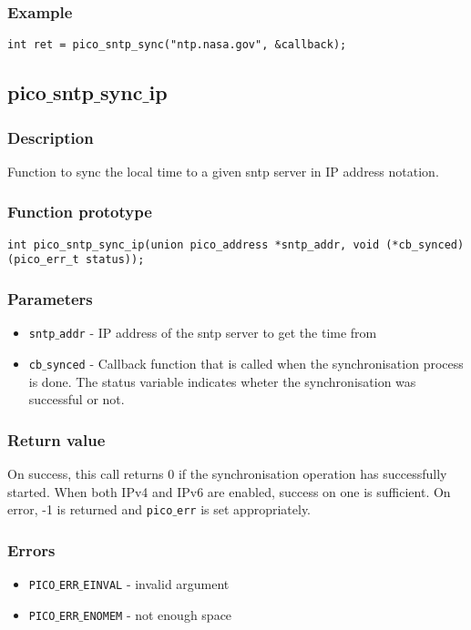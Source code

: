 \subsubsection*{Example}
\begin{verbatim}
int ret = pico_sntp_sync("ntp.nasa.gov", &callback);
\end{verbatim}


\subsection{pico$\_$sntp$\_$sync$\_$ip}

\subsubsection*{Description}
Function to sync the local time to a given sntp server in IP address notation.
\subsubsection*{Function prototype}
\begin{verbatim}
int pico_sntp_sync_ip(union pico_address *sntp_addr, void (*cb_synced)(pico_err_t status));
\end{verbatim}

\subsubsection*{Parameters}
\begin{itemize}[noitemsep]
\item \texttt{sntp$\_$addr} - IP address of the sntp server to get the time from
\item \texttt{cb$\_$synced} - Callback function that is called when the synchronisation process is done. The status variable indicates wheter the synchronisation was successful or not.
\end{itemize}

\subsubsection*{Return value}
On success, this call returns 0 if the synchronisation operation has successfully started. When both IPv4 and IPv6 are enabled, success on one is sufficient.
On error, -1 is returned and \texttt{pico$\_$err} is set appropriately.

\subsubsection*{Errors}
\begin{itemize}[noitemsep]
\item \texttt{PICO$\_$ERR$\_$EINVAL} - invalid argument
\item \texttt{PICO$\_$ERR$\_$ENOMEM} - not enough space
\end{itemize}

